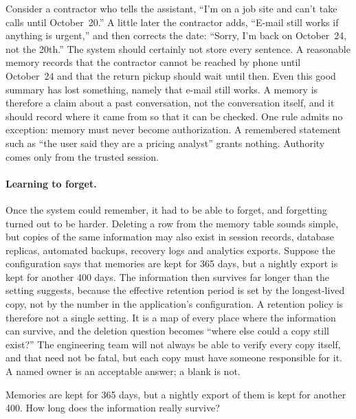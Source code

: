 Consider a contractor who tells the assistant, ``I'm on a job site and can't take calls until October~20.'' A little later the contractor adds, ``E-mail still works if anything is urgent,'' and then corrects the date: ``Sorry, I'm back on October~24, not the 20th.'' The system should certainly not store every sentence. A reasonable memory records that the contractor cannot be reached by phone until October~24 and that the return pickup should wait until then. Even this good summary has lost something, namely that e-mail still works. A memory is therefore a claim about a past conversation, not the conversation itself, and it should record where it came from so that it can be checked. One rule admits no exception: memory must never become authorization. A remembered statement such as ``the user said they are a pricing analyst'' grants nothing. Authority comes only from the trusted session.

\paragraph{Learning to forget.} Once the system could remember, it had to be able to forget, and forgetting turned out to be harder. Deleting a row from the memory table sounds simple, but copies of the same information may also exist in session records, database replicas, automated backups, recovery logs and analytics exports. Suppose the configuration says that memories are kept for 365 days, but a nightly export is kept for another 400 days. The information then survives far longer than the setting suggests, because the effective retention period is set by the longest-lived copy, not by the number in the application's configuration. A retention policy is therefore not a single setting. It is a map of every place where the information can survive, and the deletion question becomes ``where else could a copy still exist?'' The engineering team will not always be able to verify every copy itself, and that need not be fatal, but each copy must have someone responsible for it. A named owner is an acceptable answer; a blank is not.

\begin{quickcheck}
Memories are kept for 365 days, but a nightly export of them is kept for another 400. How long does the information really survive?
\end{quickcheck}

